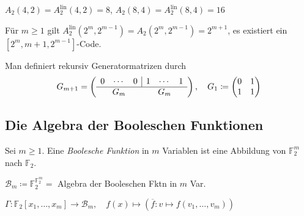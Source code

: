\documentclass{cheat-sheet}
\newcommand{\F}{\mathbb{F}} %
\newcommand{\lin}{\text{lin}} %
\begin{document}
\begin{kor}
  $A_2(4, 2) = A_2^\lin(4, 2) = 8$, \enspace
  $A_2(8, 4) = A_2^\lin(8, 4) = 16$
\end{kor}
\fi

\begin{satz}
  Für $m \geq 1$ gilt $A_2^\lin(2^m, 2^{m-1}) = A_2(2^m, 2^{m-1}) = 2^{m+1}$, \dh{} es existiert ein $[2^m, m+1, 2^{m-1}]$-Code.
\end{satz}

\begin{konstr}
  Man definiert rekursiv Generatormatrizen durch
  \[
    G_{m+1} = \left( \begin{array}{c c c | c c c}
      0 & \cdots & 0 & 1 & \cdots & 1 \\ \hline
      \multicolumn{3}{c}{G_m} & \multicolumn{3}{c}{G_m}
    \end{array} \right), \quad
    G_1 \coloneqq \begin{pmatrix}
      0 & 1 \\
      1 & 1
    \end{pmatrix}
  \]
\end{konstr}

\subsection{Die Algebra der Booleschen Funktionen}


\begin{defn}
  Sei $m \geq 1$.
  Eine \emph{Boolesche Funktion} in $m$ Variablen ist eine Abbildung von $\F_2^m$ nach $\F_2$.
\end{defn}

\begin{nota}
  $\mathcal{B}_m \coloneqq \F_2^{\F_2^m} = $ Algebra der Booleschen Fktn in $m$ Var.
\end{nota}

\begin{defn}
  $
    \Gamma : \F_2[x_1, \ldots, x_m] \to \mathcal{B}_m, \quad
    f(x) \mapsto (\overline{f} : v \mapsto f(v_1, \ldots, v_m))
  $
\end{defn}

\end{document}
